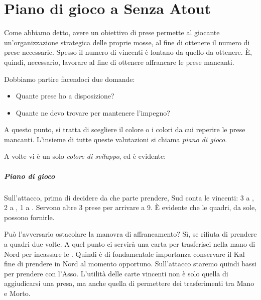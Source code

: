 \documentclass[../corsofiori.tex]{subfiles}
\begin{document}
\chapter{Piano di gioco a Senza Atout}

Come abbiamo detto, avere un obiettivo di prese permette al giocante un'organizzazione strategica delle proprie mosse, al
fine di ottenere il numero di prese necessarie.
Spesso il numero di vincenti è lontano da quello da ottenere. \`E, quindi, necessario, lavorare al fine di ottenere
affrancare le prese mancanti.

Dobbiamo partire facendoci due domande:
\begin{itemize}
    \item Quante prese ho a disposizione?
    \item Quante ne devo trovare per mantenere l'impegno?
\end{itemize}

A questo punto, si tratta di scegliere il colore o i colori da cui reperire le prese mancanti.
L'insieme di tutte queste valutazioni si chiama \emph{piano di gioco}.

A volte vi è un solo \emph{colore di sviluppo}, ed è evidente:

\newgame
{}
\leftupper{\boardtext*}%
{\dealertext\quad}{\vulnertext}
\rightlower[2ex]{\lead: 2\He}{}{}

\showAll*

\paragraph{Piano di gioco} Sull'attacco, prima di decidere da che parte prendere, Sud conta le vincenti: 3 a \pic,
2 a \cu, 1 a \fio. Servono altre 3 prese per arrivare a 9. \`E evidente che le quadri, da sole, possono fornirle.

Può l'avversario ostacolare la manovra di affrancamento? Sì, se rifiuta di prendere a quadri due volte. A quel punto ci
servirà una carta per trasferisci nella mano di Nord per incassare le \qu. Quindi è di fondamentale importanza conservare
il K\He al fine di prendere in Nord al momento opportuno. Sull'attacco staremo quindi bassi per prendere con l'Asso.
L'utilità delle carte vincenti non è solo quella di aggiudicarsi una presa, ma anche quella di permettere dei
trasferimenti tra Mano e Morto.
\end{document}
